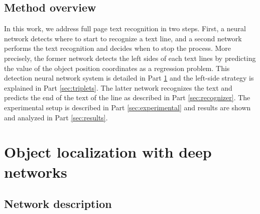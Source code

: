 \documentclass[conference]{IEEEtran}
\begin{document}
\subsection{Method overview}
In this work, we address full page text recognition in two steps. First, a neural network detects where to start to recognize a text line, and a second network performs the text recognition and decides when to stop the process. More precisely, the former network detects the left sides of each text lines by predicting the value of the object position coordinates as a regression problem. This detection neural network system is detailed in Part \ref{sec:objectLocalization} and the left-side strategy is explained in Part \ref{sec:triplets}. The latter network recognizes the text and predicts the end of the text of the line  as described in Part \ref{sec:recognizer}. The experimental setup is described in Part \ref{sec:experimental} and results are shown and analyzed in Part \ref{sec:results}.

\section{Object localization with deep networks}
\label{sec:objectLocalization}

\subsection{Network description}
\end{document}
